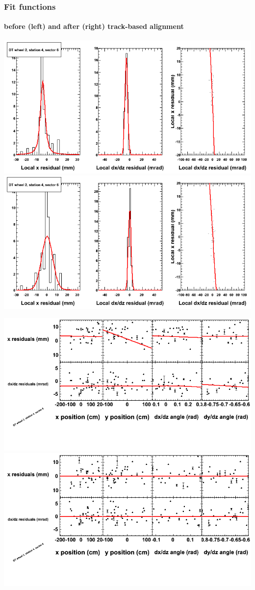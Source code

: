\documentclass[compress]{beamer}
\begin{document}
\begin{frame}
\frametitle{Fit functions}
\framesubtitle{before (left) and after (right) track-based alignment}
\includegraphics[width=0.5\linewidth]{fitfunctions_re01/MBwhEst4sec06_bellcurves.png} \includegraphics[width=0.5\linewidth]{fitfunctions_re05/MBwhEst4sec06_bellcurves.png}

\includegraphics[width=0.5\linewidth]{fitfunctions_re01/MBwhEst4sec06_polynomials.png} \includegraphics[width=0.5\linewidth]{fitfunctions_re05/MBwhEst4sec06_polynomials.png}
\end{frame}
\end{document}
